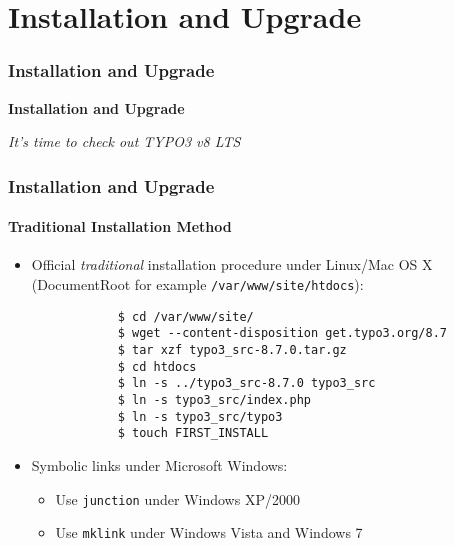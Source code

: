 %

\section{Installation and Upgrade}
\begin{frame}[fragile]
	\frametitle{Installation and Upgrade}

	\begin{center}\huge{\color{typo3darkgrey}\textbf{Installation and Upgrade}}\end{center}
	\begin{center}\large{\textit{It's time to check out TYPO3 v8 LTS}}\end{center}

\end{frame}

\begin{frame}[fragile]
	\frametitle{Installation and Upgrade}
	\framesubtitle{Traditional Installation Method}

	\begin{itemize}
		\item Official \textit{traditional} installation procedure under Linux/Mac OS X\newline
			(DocumentRoot for example \texttt{/var/www/site/htdocs}):
		\begin{lstlisting}
			$ cd /var/www/site/
			$ wget --content-disposition get.typo3.org/8.7
			$ tar xzf typo3_src-8.7.0.tar.gz
			$ cd htdocs
			$ ln -s ../typo3_src-8.7.0 typo3_src
			$ ln -s typo3_src/index.php
			$ ln -s typo3_src/typo3
			$ touch FIRST_INSTALL
		\end{lstlisting}

		\item Symbolic links under Microsoft Windows:

			\begin{itemize}
				\item Use \texttt{junction} under Windows XP/2000
				\item Use \texttt{mklink} under Windows Vista and Windows 7
			\end{itemize}

	\end{itemize}
\end{frame}

